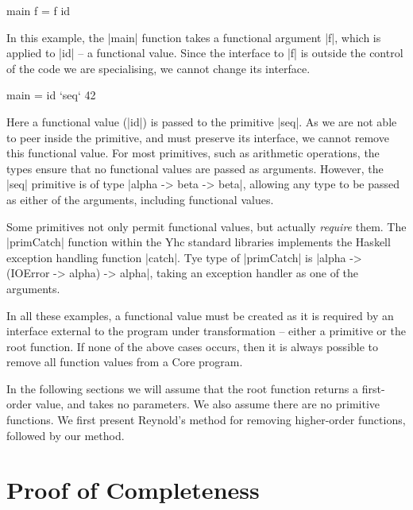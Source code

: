 \documentclass[preprint]{sigplanconf}
\begin{document}
\begin{example}
\begin{code}
main f = f id
\end{code}

In this example, the |main| function takes a functional argument |f|, which is applied to |id| -- a functional value. Since the interface to |f| is outside the control of the code we are specialising, we cannot change its interface.
\end{example}

\begin{example}
\begin{code}
main = id `seq` 42
\end{code}

Here a functional value (|id|) is passed to the primitive |seq|. As we are not able to peer inside the primitive, and must preserve its interface, we cannot remove this functional value. For most primitives, such as arithmetic operations, the types ensure that no functional values are passed as arguments. However, the |seq| primitive is of type |alpha -> beta -> beta|, allowing any type to be passed as either of the arguments, including functional values.

Some primitives not only permit functional values, but actually \textit{require} them. The |primCatch| function within the Yhc standard libraries implements the Haskell exception handling function |catch|. Tye type of |primCatch| is |alpha -> (IOError -> alpha) -> alpha|, taking an exception handler as one of the arguments.
\end{example}

In all these examples, a functional value must be created as it is required by an interface external to the program under transformation -- either a primitive or the root function. If none of the above cases occurs, then it is always possible to remove all function values from a Core program.

In the following sections we will assume that the root function returns a first-order value, and takes no parameters. We also assume there are no primitive functions. We first present Reynold's method for removing higher-order functions, followed by our method.

\section{Proof of Completeness}

\end{document}
